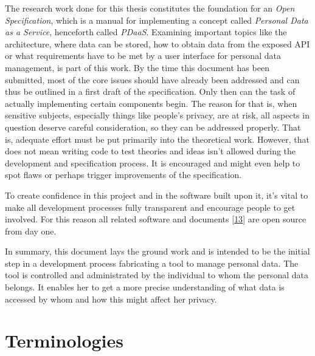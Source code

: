 \documentclass[12pt,english,a4paper,titlepage,cleardoublepage=empty,dottedtoc]{report}
\begin{document}
The research work done for this thesis constitutes the foundation for an
\emph{Open Specification}, which is a manual for implementing a concept
called \emph{Personal Data as a Service}, henceforth called
\emph{PDaaS}. Examining important topics like the architecture, where
data can be stored, how to obtain data from the exposed API or what
requirements have to be met by a user interface for personal data
management, is part of this work. By the time this document has been
submitted, most of the core issues should have already been addressed
and can thus be outlined in a first draft of the specification. Only
then can the task of actually implementing certain components begin. The
reason for that is, when sensitive subjects, especially things like
people's privacy, are at risk, all aspects in question deserve careful
consideration, so they can be addressed properly. That is, adequate
effort must be put primarily into the theoretical work. However, that
does not mean writing code to test theories and ideas isn't allowed
during the development and specification process. It is encouraged and
might even help to spot flaws or perhaps trigger improvements of the
specification.

To create confidence in this project and in the software built upon it,
it's vital to make all development processes fully transparent and
encourage people to get involved. For this reason all related software
and documents {[}\protect\hyperlink{ref-repo_2016_pdaas-spec}{13}{]} are
open source from day one.

In summary, this document lays the ground work and is intended to be the
initial step in a development process fabricating a tool to manage
personal data. The tool is controlled and administrated by the
individual to whom the personal data belongs. It enables her to get a
more precise understanding of what data is accessed by whom and how this
might affect her privacy.

\hypertarget{terminologies}{\section{Terminologies}\label{terminologies}}
\end{document}

